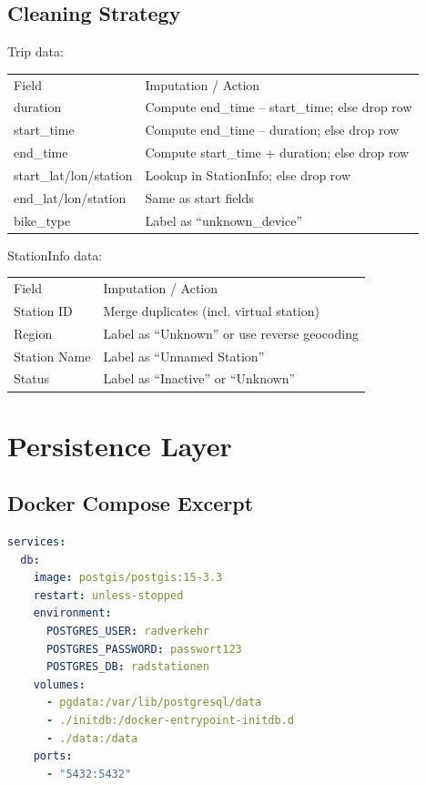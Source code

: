 \documentclass{article}
\begin{document}
\subsection{Cleaning Strategy}
Trip data:
\begin{table}[H]
\centering
\begin{tabular}{l l}
Field & Imputation / Action \\
 duration & Compute end\_time -- start\_time; else drop row \\
 start\_time & Compute end\_time -- duration; else drop row \\
 end\_time & Compute start\_time + duration; else drop row \\
 start\_lat/lon/station & Lookup in StationInfo; else drop row \\
 end\_lat/lon/station & Same as start fields \\
 bike\_type & Label as ``unknown\_device'' \\
\end{tabular}
\end{table}

StationInfo data:
\begin{table}[H]
\centering
\begin{tabular}{l l}
Field & Imputation / Action \\
 Station ID & Merge duplicates (incl. virtual station) \\
 Region & Label as ``Unknown'' or use reverse geocoding \\
 Station Name & Label as ``Unnamed Station'' \\
 Status & Label as ``Inactive'' or ``Unknown'' \\
\end{tabular}
\end{table}

\section{Persistence Layer}

\subsection{Docker Compose Excerpt}
\begin{lstlisting}[language=yaml]
services:
  db:
    image: postgis/postgis:15-3.3
    restart: unless-stopped
    environment:
      POSTGRES_USER: radverkehr
      POSTGRES_PASSWORD: passwort123
      POSTGRES_DB: radstationen
    volumes:
      - pgdata:/var/lib/postgresql/data
      - ./initdb:/docker-entrypoint-initdb.d
      - ./data:/data
    ports:
      - "5432:5432"
\end{lstlisting}
\end{document}

